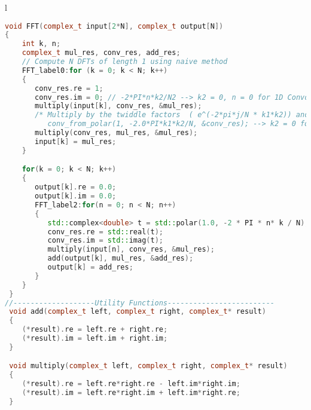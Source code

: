 \begin{table}[!h]
\centering
\caption{Non-recursive 1-D FFT}
\label{fhewcode1:fft1}
\begin{tabular}{l}
\toprule
\begin{lstlisting}[columns=fullflexible, language=C++,escapechar=\$]
void FFT(complex_t input[2*N], complex_t output[N])
{
    int k, n;
    complex_t mul_res, conv_res, add_res;
    // Compute N DFTs of length 1 using naive method
    FFT_label0:for (k = 0; k < N; k++)
    {
       conv_res.re = 1;
       conv_res.im = 0; // -2*PI*n*k2/N2 --> k2 = 0, n = 0 for 1D Convolution
       multiply(input[k], conv_res, &mul_res);
       /* Multiply by the twiddle factors  ( e^(-2*pi*j/N * k1*k2)) and transpose
          conv_from_polar(1, -2.0*PI*k1*k2/N, &conv_res); --> k2 = 0 for 1D Convolution */
       multiply(conv_res, mul_res, &mul_res);
       input[k] = mul_res;
    }

    for(k = 0; k < N; k++)
    {
       output[k].re = 0.0;
       output[k].im = 0.0;
       FFT_label2:for(n = 0; n < N; n++)
       {
    	  std::complex<double> t = std::polar(1.0, -2 * PI * n* k / N);
    	  conv_res.re = std::real(t);
    	  conv_res.im = std::imag(t);
          multiply(input[n], conv_res, &mul_res);
          add(output[k], mul_res, &add_res);
          output[k] = add_res;
       }
    }
 }
//-------------------Utility Functions-------------------------
 void add(complex_t left, complex_t right, complex_t* result)
 {
    (*result).re = left.re + right.re;
    (*result).im = left.im + right.im;
 }

 void multiply(complex_t left, complex_t right, complex_t* result)
 {
    (*result).re = left.re*right.re - left.im*right.im;
    (*result).im = left.re*right.im + left.im*right.re;
 }
\end{lstlisting}
\\
\bottomrule
\end{tabular}
\end{table}

